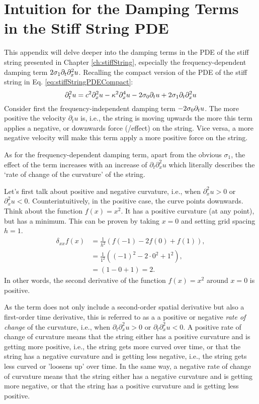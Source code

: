 \chapter{Intuition for the Damping Terms in the Stiff String PDE}\label{app:intuitionSigma1}
This appendix will delve deeper into the damping terms in the PDE of the stiff string presented in Chapter \ref{ch:stiffString}, especially the frequency-dependent damping term $2\sigma_1\partial_t\partial_x^2 u$. Recalling the compact version of the PDE of the stiff string in Eq. \eqref{eq:stiffStringPDECompact}:
\begin{equation}
    \partial_t^2 u = c^2 \partial_x^2 u - \kappa^2 \partial_x^4 u - 2 \sigma_{0} \partial_t u + 2 \sigma_{1} \partial_t \partial_x^2 u
\end{equation}
Consider first the frequency-independent damping term $-2\sigma_{0}\partial_t u$. The more positive the velocity $\partial_tu$ is, i.e., the string is moving upwards the more this term applies a negative, or downwards force (/effect) on the string. Vice versa, a more negative velocity will make this term apply a more positive force on the string. 

As for the frequency-dependent damping term, apart from the obvious $\sigma_1$, the effect of the term increases with an increase of $\partial_t\partial_x^2u$ which literally describes the `rate of change of the curvature' of the string.

Let's first talk about positive and negative curvature, i.e., when $\partial_x^2u > 0$ or $\partial_x^2u < 0$. Counterintuitively, in the positive case, the curve points downwards. Think about the function $f(x) = x^2$. It has a positive curvature (at any point), but has a minimum. This can be proven by taking $x=0$ and setting grid spacing $h=1$.
\begin{equation}
  \begin{aligned}
  \delta_{xx}f(x) &= \frac{1}{h^2} \left(f(-1)-2f(0)+f(1)\right), \\
  &= \frac{1}{1^2} \left((-1)^2-2\cdot0^2+1^2\right),\\
  &= \left(1-0+1\right) = 2.
  \end{aligned}
\end{equation}
In other words, the second derivative of the function $f(x)=x^2$ around $x=0$ is positive.

As the term does not only include a second-order spatial derivative but also a first-order time derivative, this is referred to as a a positive or negative \textit{rate of change} of the curvature, i.e., when $\partial_t\partial_x^2u>0$ or $\partial_t\partial_x^2u<0$. A positive rate of change of curvature means that the string either has a positive curvature and is getting more positive, i.e., the string gets more curved over time, or that the string has a negative curvature and is getting less negative, i.e., the string gets less curved or 'loosens up' over time.  In the same way, a negative rate of change of curvature means that the string either has a negative curvature and is getting more negative, or that the string has a positive curvature and is getting less positive. 

